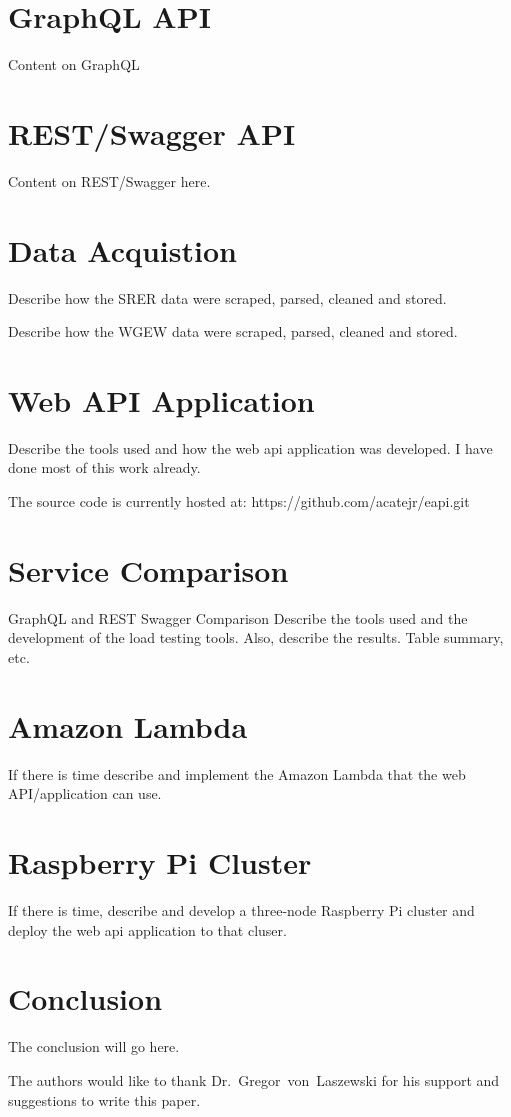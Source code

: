 \section{GraphQL API}
Content on GraphQL

\section{REST/Swagger API}
Content on REST/Swagger here.

\section{Data Acquistion}
Describe how the SRER data were scraped, parsed, cleaned and stored.

Describe how the WGEW data were scraped, parsed, cleaned and stored.

\section{Web API Application}
Describe the tools used and how the web api application was developed.
I have done most of this work already.

The source code is currently hosted at: https://github.com/acatejr/eapi.git

\section{Service Comparison}
GraphQL and REST Swagger Comparison
Describe the tools used and the development of the load testing tools.  
Also, describe the results.  Table summary, etc.

\section{Amazon Lambda}
If there is time describe and implement the Amazon Lambda that the web 
API/application can use.

\section{Raspberry Pi Cluster}
If there is time, describe and develop a three-node Raspberry Pi cluster and 
deploy the web api application to that cluser.

\section{Conclusion}
The conclusion will go here.

\begin{acks}
The authors would like to thank Dr.~Gregor~von~Laszewski for his support 
and suggestions to write this paper.
\end{acks}


 
